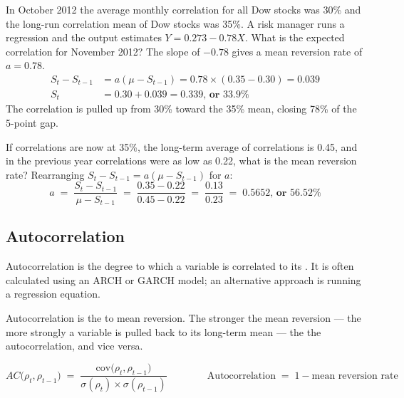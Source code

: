 \begin{mrexbox}[title={Example 1 --- calculating the expected correlation (solving for $S_t$)}]
In October 2012 the average monthly correlation for all Dow stocks was 30\% and the long-run
correlation mean of Dow stocks was 35\%. A risk manager runs a regression and the output
estimates $Y = 0.273 - 0.78X$. What is the expected correlation for November 2012?
\tcblower
\small
The slope of $-0.78$ gives a mean reversion rate of $a = 0.78$.
\begin{align*}
S_t - S_{t-1} &= a(\mu - S_{t-1}) = 0.78 \times (0.35 - 0.30) = 0.039\\
S_t &= 0.30 + 0.039 = \mathbf{0.339 \text{, or } 33.9\%}
\end{align*}
The correlation is pulled up from 30\% toward the 35\% mean, closing 78\% of the 5-point gap.
\end{mrexbox}

\begin{mrexbox}[title={Example 2 --- calculating the mean reversion rate}]
If correlations are now at 35\%, the long-term average of correlations is 0.45, and in the
previous year correlations were as low as 0.22, what is the mean reversion rate?
\tcblower
\small
Rearranging $S_t - S_{t-1} = a(\mu - S_{t-1})$ for $a$:
\[ a \;=\; \frac{S_t - S_{t-1}}{\mu - S_{t-1}} \;=\; \frac{0.35 - 0.22}{0.45 - 0.22}
   \;=\; \frac{0.13}{0.23} \;=\; \mathbf{0.5652 \text{, or } 56.52\%} \]
\end{mrexbox}

\subsection{Autocorrelation}
Autocorrelation is the degree to which a variable is correlated to its . It is
often calculated using an ARCH or GARCH model; an alternative approach is running a regression
equation.

\begin{mrdefbox}[title={The reverse property}]
Autocorrelation is the  to mean reversion. The stronger the mean
reversion --- the more strongly a variable is pulled back to its long-term mean --- the
 the autocorrelation, and vice versa.
\end{mrdefbox}

\begin{mrfmlbox}
\[ AC\bigl(\rho_t, \rho_{t-1}\bigr) \;=\;
   \frac{\mathrm{cov}\bigl(\rho_t, \rho_{t-1}\bigr)}{\sigma(\rho_t) \times \sigma(\rho_{t-1})}
   \qquad\qquad
   \text{Autocorrelation} \;=\; 1 - \text{mean reversion rate} \]
\end{mrfmlbox}

